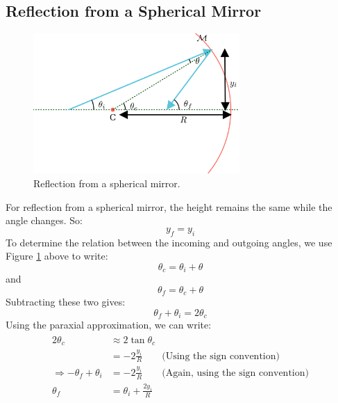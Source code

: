\documentclass[12pt]{article}
\begin{document}
\subsection{Reflection from a Spherical Mirror}
\begin{figure}[h]
    \centering
    \includegraphics[width=0.7\textwidth]{images/reflection.png}
    \caption{Reflection from a spherical mirror.}
    \label{fig:reflection}
\end{figure}
For reflection from a spherical mirror, the height remains the same while the angle changes. So:
\begin{equation*}
    y_f = y_i
\end{equation*}
To determine the relation between the incoming and outgoing angles, we use Figure \ref{fig:reflection} above to write:
\begin{equation*}
    \theta_c = \theta_i + \theta
\end{equation*}
and
\begin{equation*}
    \theta_f = \theta_c + \theta
\end{equation*}
Subtracting these two gives:
\begin{equation}
    \label{eq:theta-f}
    \theta_f + \theta_i = 2\theta_c
\end{equation}
Using the paraxial approximation, we can write:
\begin{align}
    \begin{split}
        2\theta_c &\approx 2 \tan{\theta_c}\\
        & = -2\frac{y_i}{R} \quad \quad\text{(Using the sign convention)}\\
        \Rightarrow -\theta_f + \theta_i &= -2\frac{y_i}{R} \quad \quad\text{(Again, using the sign convention)}\\
        \theta_f &= \theta_i + \frac{2y_i}{R}
    \end{split}
\end{align}
\end{document}
